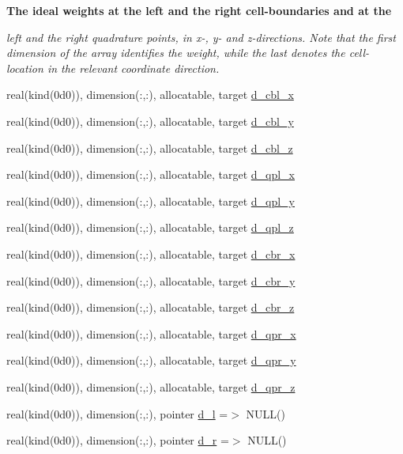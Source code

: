 \begin{Indent}\textbf{ The ideal weights at the left and the right cell-\/boundaries and at the}\par
{\em left and the right quadrature points, in x-\/, y-\/ and z-\/directions. Note that the first dimension of the array identifies the weight, while the last denotes the cell-\/location in the relevant coordinate direction. }\begin{DoxyCompactItemize}
\item 
real(kind(0d0)), dimension(\+:,\+:), allocatable, target \hyperlink{namespacem__weno_a64f585ebbc4e1bdaa629668e6dcc1c93}{d\+\_\+cbl\+\_\+x}
\item 
real(kind(0d0)), dimension(\+:,\+:), allocatable, target \hyperlink{namespacem__weno_a125fdee7148fefc8b5e6d35daece70d5}{d\+\_\+cbl\+\_\+y}
\item 
real(kind(0d0)), dimension(\+:,\+:), allocatable, target \hyperlink{namespacem__weno_aa79c790927be06b0b135c5d6e2a745af}{d\+\_\+cbl\+\_\+z}
\item 
real(kind(0d0)), dimension(\+:,\+:), allocatable, target \hyperlink{namespacem__weno_abbcb8241757105e94347691a4b578e18}{d\+\_\+qpl\+\_\+x}
\item 
real(kind(0d0)), dimension(\+:,\+:), allocatable, target \hyperlink{namespacem__weno_a041d103130713b7b3e8669c46b6d7ab0}{d\+\_\+qpl\+\_\+y}
\item 
real(kind(0d0)), dimension(\+:,\+:), allocatable, target \hyperlink{namespacem__weno_a058a869c6fa80036a080e4a2b28bfd19}{d\+\_\+qpl\+\_\+z}
\item 
real(kind(0d0)), dimension(\+:,\+:), allocatable, target \hyperlink{namespacem__weno_a91ff94c189407ac68a278d95054d86b7}{d\+\_\+cbr\+\_\+x}
\item 
real(kind(0d0)), dimension(\+:,\+:), allocatable, target \hyperlink{namespacem__weno_a4ba1bee6ea194265fb96686ee57c877c}{d\+\_\+cbr\+\_\+y}
\item 
real(kind(0d0)), dimension(\+:,\+:), allocatable, target \hyperlink{namespacem__weno_a02d6127ab8eaea07640ccfcdc516e5c4}{d\+\_\+cbr\+\_\+z}
\item 
real(kind(0d0)), dimension(\+:,\+:), allocatable, target \hyperlink{namespacem__weno_af7a633ce21fa6828a11c4594abccbd61}{d\+\_\+qpr\+\_\+x}
\item 
real(kind(0d0)), dimension(\+:,\+:), allocatable, target \hyperlink{namespacem__weno_a705ea5ec335fcf839b93e6e42204b850}{d\+\_\+qpr\+\_\+y}
\item 
real(kind(0d0)), dimension(\+:,\+:), allocatable, target \hyperlink{namespacem__weno_ae1cbc7d2a0f6da59401e7a15dff4c2fc}{d\+\_\+qpr\+\_\+z}
\item 
real(kind(0d0)), dimension(\+:,\+:), pointer \hyperlink{namespacem__weno_ab020cbb64bcbdee4c70f6eee10d5d064}{d\+\_\+l} =$>$ N\+U\+LL()
\item 
real(kind(0d0)), dimension(\+:,\+:), pointer \hyperlink{namespacem__weno_a587c6a49c1eb9f3d35be2735a56edd01}{d\+\_\+r} =$>$ N\+U\+LL()
\end{DoxyCompactItemize}
\end{Indent}
